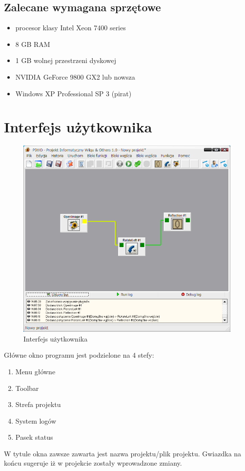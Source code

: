 \documentclass[a4paper,10pt]{article}
\begin{document}
\subsection{Zalecane wymagana sprzętowe}
\begin{itemize}
 \item procesor klasy Intel Xeon 7400 series
 \item 8 GB RAM
 \item 1 GB wolnej przestrzeni dyskowej
 \item NVIDIA GeForce 9800 GX2 lub nowsza
 \item Windows XP Professional SP 3 (pirat)
\end{itemize}
\section{Interfejs użytkownika}
\begin{figure}[h]
 \centering
 \includegraphics[scale=0.5]{main}
 \caption{Interfejs użytkownika}
 \label{fig:Interface}
\end{figure}
\newpage
Główne okno programu jest podzielone na 4 stefy:
\begin{enumerate}
 \item Menu główne
 \item Toolbar
 \item Strefa projektu
 \item System logów
 \item Pasek status
\end{enumerate}
W tytule okna zawsze zawarta jest nazwa projektu/plik projektu. Gwiazdka na końcu sugeruje iż w projekcie zostały wprowadzone zmiany.
\end{document}
